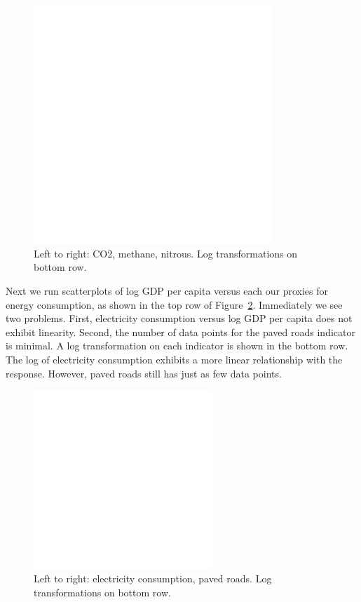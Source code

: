 \documentclass[12pt]{article}
\begin{document}
\begin{figure}[h!]
  \centering
  \includegraphics[width=0.8\textwidth]{images/climate_model_scatter_pollution}
  \caption{\label{climate_model_scatter_pollution}Left to right: CO2, methane, nitrous. Log transformations on bottom row.}
\end{figure}

Next we run scatterplots of log GDP per capita versus each our proxies for energy consumption, as shown in the top row of Figure~\ref{climate_model_scatter_elec_roads}. Immediately we see two problems. First, electricity consumption versus log GDP per capita does not exhibit linearity. Second, the number of data points for the paved roads indicator is minimal. A log transformation on each indicator is shown in the bottom row. The log of electricity consumption exhibits a more linear relationship with the response. However, paved roads still has just as few data points.

\begin{figure}[h!]
  \centering
  \includegraphics[width=0.6\textwidth]{images/climate_model_scatter_elec_roads}
  \caption{\label{climate_model_scatter_elec_roads}Left to right: electricity consumption, paved roads. Log transformations on bottom row.}
\end{figure}
\end{document}
